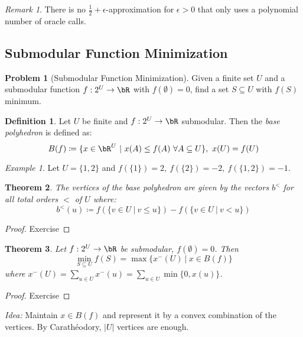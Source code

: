 \documentclass[11pt, a4paper]{article}
\newcommand{\abs}[1]{\left\lvert#1\right\rvert}
\newcommand{\set}[1]{\{#1\}}
\newtheorem{theorem}{Theorem}[section]
\theoremstyle{remark}
\newtheorem*{uremark}{Remark}
\newtheorem*{example}{Example}
\theoremstyle{definition}
\newtheorem{definition}[theorem]{Definition}
\newtheorem*{problem}{Problem}
\begin{document}
\begin{uremark}
	There is no $\frac{1}{2}+\epsilon$-approximation for $\epsilon>0$ that
	only uses a polynomial number of oracle calls.
\end{uremark}


\subsection{Submodular Function Minimization}

\begin{problem}[Submodular Function Minimization]
Given a finite set $U$ and a submodular function $f: 2^U\to\bR$ with
$f(\emptyset)=0$, find a set $S\subseteq U$ with $f(S)$ minimum.
\end{problem}

\setcounter{theorem}{52}
\begin{definition}
	Let $U$ be finite and $f: 2^U\to\bR$ submodular. Then the \emph{base
		polyhedron} is defined as:
	\[B(f)\coloneqq\set{x\in\bR^U\ |\ x(A)\leq f(A)\ \forall A\subseteq U},\
		x(U)=f(U)\]
\end{definition}

\begin{example}
	Let $U=\set{1,2}$ and $f(\set{1})=2,\ f(\set{2})=-2,\ f(\set{1,2})=-1$.
\end{example}

\begin{theorem}
	The vertices of the base polyhedron are given by the vectors $b^<$
	for all total orders $<$ of $U$ where:
	\[b^<(u)\coloneqq f(\set{v\in U\ |\ v\leq u})-f(\set{v\in U\ |\ v<u})\]
\end{theorem}
\begin{proof}
	Exercise
\end{proof}

\begin{theorem}\label{thm:submodular-min}
	Let $f: 2^U\to\bR$ be submodular, $f(\emptyset)=0$. Then
	\[\min_{S\subseteq U}f(S)=\max\set{x^-(U)\ |\ x\in B(f)}\]
	where $x^-(U)=\sum_{u\in U}x^-(u)=\sum_{u\in U}\min\set{0,x(u)}$.
\end{theorem}
\begin{proof}
	Exercise
\end{proof}

\emph{Idea:} Maintain $x\in B(f)$ and represent it by a convex combination
of the vertices. By Carathéodory, $\abs{U}$ vertices are enough.
\end{document}
